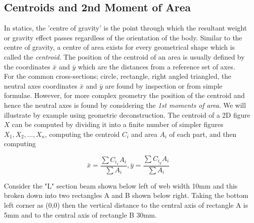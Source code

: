 \documentclass[12pt, letterpaper, twoside]{article}
\begin{document}
\subsection{Centroids and 2nd Moment of Area}


In statics, the 'centre of gravity' is the point through which the resultant weight or gravity effect passes regardless of the orientation of the body. Similar to the centre of gravity, a centre of area exists for every geometrical shape which is called the \emph{centroid}. The position of the centroid of an area is usually defined by the coordinates $\bar{x}$ and $\bar{y}$  which are the distances from a reference set of axes.\\
For the common cross-sections; circle, rectangle, right angled triangled, the neutral axes coordinates  $\bar{x}$ and $\bar{y}$ are found by inspection or from simple formulae. However, for more complex geometry the position of the centroid and hence the neutral axes is found by considering the \emph{1st moments of area}. We will illustrate by example using geometric deconstruction.  The centroid of a 2D figure $X$ can be computed by dividing it into a finite number of simpler figures $ X_{1},X_{2},\dots ,X_{n}$, computing the centroid $ C_{i}$ and area $A_{i}$ of each part, and then computing

\begin{equation}
\bar{x}={\frac {\sum C_{i_{x}}A_{i}}{\sum A_{i}}},\bar{y}={\frac {\sum C_{i_{y}}A_{i}}{\sum A_{i}}}
\end{equation}

\bigskip

Consider the "L" section beam shown below left of web width 10mm and this broken down into two rectangles A and B shown below right.  Taking the bottom left corner as (0,0) then the vertical distance to the central axis of rectangle A is 5mm and to the central axis of rectangle B 30mm.
\end{document}
